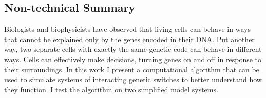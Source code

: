 \documentclass[english,letterpaper,12pt]{report}
\begin{document}
\begin{doublespacing}
\section*{Non-technical Summary}
Biologists and biophysicists have observed that living cells can behave in ways that cannot be explained only by the genes encoded in their DNA. Put another way, two separate cells with exactly the same genetic code can behave in different ways. Cells can effectively make decisions, turning genes on and off in response to their surroundings. In this work I present a computational algorithm that can be used to simulate systems of interacting genetic switches to better understand how they function. I test the algorithm on two simplified model systems.

\pagebreak[4]

\end{doublespacing}

\tableofcontents
\end{document}

